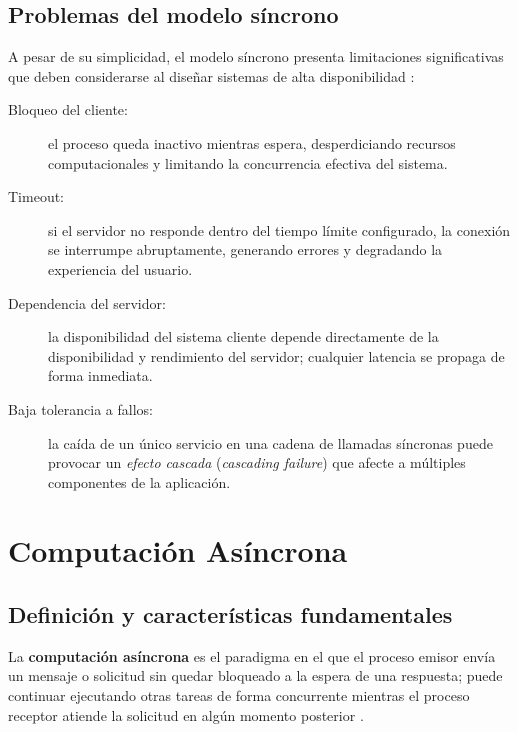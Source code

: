 \documentclass[12pt,a4paper]{article}
\begin{document}
\subsection{Problemas del modelo síncrono}
 
A pesar de su simplicidad, el modelo síncrono presenta limitaciones significativas que deben considerarse al diseñar sistemas de alta disponibilidad \cite{ref8}:
 
\begin{tcolorbox}[colback=red!5!white,colframe=red!40!black,title=Problemas del Modelo Síncrono,fonttitle=\bfseries]
\begin{description}
  \item[Bloqueo del cliente:] el proceso queda inactivo mientras espera, desperdiciando recursos computacionales y limitando la concurrencia efectiva del sistema.
  \item[Timeout:] si el servidor no responde dentro del tiempo límite configurado, la conexión se interrumpe abruptamente, generando errores y degradando la experiencia del usuario.
  \item[Dependencia del servidor:] la disponibilidad del sistema cliente depende directamente de la disponibilidad y rendimiento del servidor; cualquier latencia se propaga de forma inmediata.
  \item[Baja tolerancia a fallos:] la caída de un único servicio en una cadena de llamadas síncronas puede provocar un \textit{efecto cascada} (\textit{cascading failure}) que afecte a múltiples componentes de la aplicación.
\end{description}
\end{tcolorbox}
 
\section{Computación Asíncrona}
 
\subsection{Definición y características fundamentales}
 
La \textbf{computación asíncrona} es el paradigma en el que el proceso emisor envía un mensaje o solicitud sin quedar bloqueado a la espera de una respuesta; puede continuar ejecutando otras tareas de forma concurrente mientras el proceso receptor atiende la solicitud en algún momento posterior \cite{ref9}.
 
\end{document}
